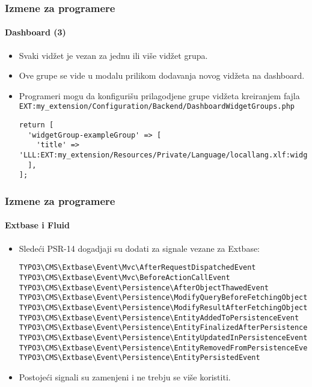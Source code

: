 \begin{frame}[fragile]
	\frametitle{Izmene za programere}
	\framesubtitle{Dashboard (3)}

	\lstset{basicstyle=\tiny\ttfamily}

	\begin{itemize}
		\item Svaki vidžet je vezan za jednu ili više vidžet grupa.
		\item Ove grupe se vide u modalu prilikom dodavanja novog vidžeta na dashboard.
		\item Programeri mogu da konfigurišu prilagodjene grupe vidžeta kreiranjem fajla\newline
			\smaller
				\texttt{EXT:my\_extension/Configuration/Backend/DashboardWidgetGroups.php}
			\normalsize

\vspace{-0.4cm}
\begin{lstlisting}
return [
  'widgetGroup-exampleGroup' => [
    'title' => 'LLL:EXT:my_extension/Resources/Private/Language/locallang.xlf:widget_group_name',
  ],
];
\end{lstlisting}

	\end{itemize}

\end{frame}


\begin{frame}[fragile]
	\frametitle{Izmene za programere}
	\framesubtitle{Extbase i Fluid}

	\lstset{basicstyle=\tiny\ttfamily}

	\begin{itemize}
		\item Sledeći PSR-14 dogadjaji su dodati za signale vezane za Extbase:

\vspace{-0.4cm}
\begin{lstlisting}
TYPO3\CMS\Extbase\Event\Mvc\AfterRequestDispatchedEvent
TYPO3\CMS\Extbase\Event\Mvc\BeforeActionCallEvent
TYPO3\CMS\Extbase\Event\Persistence\AfterObjectThawedEvent
TYPO3\CMS\Extbase\Event\Persistence\ModifyQueryBeforeFetchingObjectDataEvent
TYPO3\CMS\Extbase\Event\Persistence\ModifyResultAfterFetchingObjectDataEvent
TYPO3\CMS\Extbase\Event\Persistence\EntityAddedToPersistenceEvent
TYPO3\CMS\Extbase\Event\Persistence\EntityFinalizedAfterPersistenceEvent
TYPO3\CMS\Extbase\Event\Persistence\EntityUpdatedInPersistenceEvent
TYPO3\CMS\Extbase\Event\Persistence\EntityRemovedFromPersistenceEvent
TYPO3\CMS\Extbase\Event\Persistence\EntityPersistedEvent
\end{lstlisting}

		\item Postojeći signali su zamenjeni i ne trebju se više koristiti.

	\end{itemize}

\end{frame}

